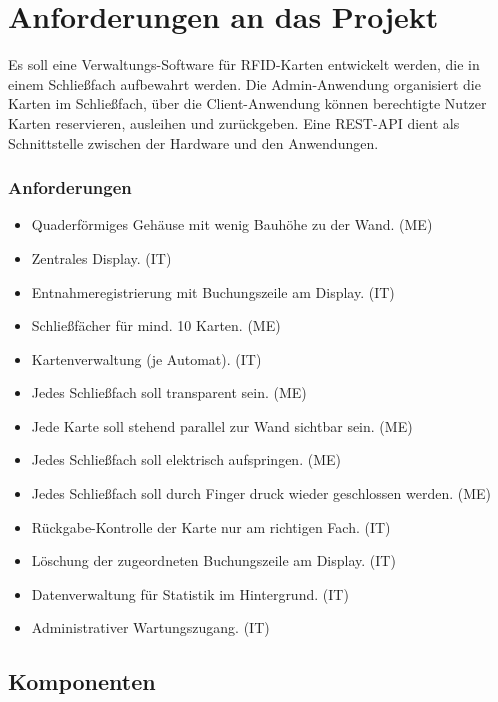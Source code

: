 \chapter{Anforderungen an das Projekt}

 Es soll eine Verwaltungs-Software für RFID-Karten entwickelt werden, die in einem Schließfach aufbewahrt werden. Die Admin-Anwendung organisiert die Karten im Schließfach, über die Client-Anwendung  können berechtigte Nutzer Karten reservieren, ausleihen und zurückgeben. Eine REST-API dient als Schnittstelle zwischen der Hardware und den Anwendungen.
\subsection{Anforderungen}
\begin{itemize}
    \item Quaderförmiges Gehäuse mit wenig Bauhöhe zu der Wand. (ME)
    \item Zentrales Display. (IT)
    \item Entnahmeregistrierung mit Buchungszeile am Display. (IT)
    \item Schließfächer für mind. 10 Karten. (ME)
    \item Kartenverwaltung (je Automat). (IT)
    \item Jedes Schließfach soll transparent sein. (ME)
    \item Jede Karte soll stehend parallel zur Wand sichtbar sein. (ME)
    \item Jedes Schließfach soll elektrisch aufspringen. (ME)
    \item Jedes Schließfach soll durch Finger druck wieder geschlossen werden. (ME)
    \item Rückgabe-Kontrolle der Karte nur am richtigen Fach. (IT)
    \item Löschung der zugeordneten Buchungszeile am Display. (IT)
    \item Datenverwaltung für Statistik im Hintergrund. (IT)
    \item Administrativer Wartungszugang. (IT)
\end{itemize}

\section{Komponenten}

